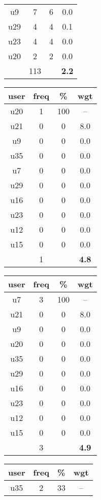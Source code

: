 \begin{appendices}
\begin{table}
\begin{tabular}{ |c|c|c|c| }
	u9 & 7 & 6 & 0.0 \\
	u29 & 4 & 4 & 0.1 \\
	u23 & 4 & 4 & 0.0 \\
	u20 & 2 & 2 & 0.0 \\
	 & 113 & & \textbf{2.2} \\
	\hline
\end{tabular}
\begin{tabular}{ |c|c|c|c| }
	\hline
	\textbf{user} & \textbf{freq} & \textbf{\%} & \textbf{wgt} \\
	\hline
	u20 & 1 & 100 & -- \\
	u21 & 0 & 0 & 8.0 \\
	u9 & 0 & 0 & 0.0 \\
	u35 & 0 & 0 & 0.0 \\
	u7 & 0 & 0 & 0.0 \\
	u29 & 0 & 0 & 0.0 \\
	u16 & 0 & 0 & 0.0 \\
	u23 & 0 & 0 & 0.0 \\
	u12 & 0 & 0 & 0.0 \\
	u15 & 0 & 0 & 0.0 \\
	 & 1 & & \textbf{4.8} \\
	\hline
\end{tabular}
\begin{tabular}{ |c|c|c|c| }
	\hline
	\textbf{user} & \textbf{freq} & \textbf{\%} & \textbf{wgt} \\
	\hline
	u7 & 3 & 100 & -- \\
	u21 & 0 & 0 & 8.0 \\
	u9 & 0 & 0 & 0.0 \\
	u20 & 0 & 0 & 0.0 \\
	u35 & 0 & 0 & 0.0 \\
	u29 & 0 & 0 & 0.0 \\
	u16 & 0 & 0 & 0.0 \\
	u23 & 0 & 0 & 0.0 \\
	u12 & 0 & 0 & 0.0 \\
	u15 & 0 & 0 & 0.0 \\
	 & 3 & & \textbf{4.9} \\
	\hline
\end{tabular}
\begin{tabular}{ |c|c|c|c| }
	\hline
	\textbf{user} & \textbf{freq} & \textbf{\%} & \textbf{wgt} \\
	\hline
	u35 & 2 & 33 & -- \\

\end{tabular}
\end{table}
\end{appendices}
